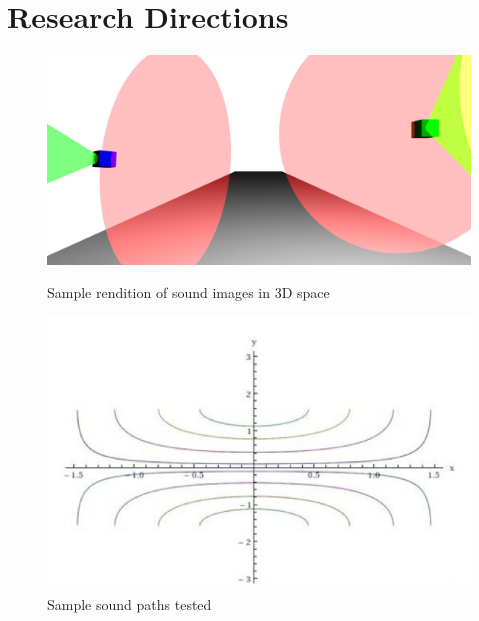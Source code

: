 
\newpage                                          \chapter{Research Directions}

\begin{figure}[htbp2]
  \begin{minipage}[b]{.45\linewidth}
    \centering
  \includegraphics[width=1\linewidth]{images/irys_screenshot.jpg}
    \caption{   \small
 Sample rendition of sound images in 3D space}
    \label{fig:irys}
  \end{minipage}
  \hspace{0.5cm}
  \begin{minipage}[b]{0.45\linewidth}
    \centering
  \includegraphics[width=1\linewidth]{images/irys_pathways.jpg}
    \caption{  \small Sample sound paths tested}
    \label{fig:irys_paths}
  \end{minipage}
\end{figure}

